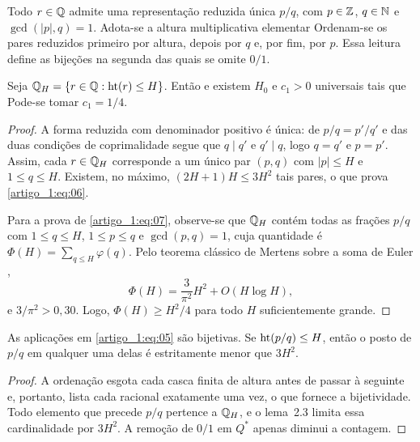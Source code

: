 Todo $r\in\mathbb Q$ admite uma representação reduzida única $p/q$, com $p\in\mathbb Z$, $q\in\mathbb N$ e $\gcd(|p|,q)=1$. Adota-se a altura multiplicativa elementar
Ordenam-se os pares reduzidos primeiro por altura, depois por $q$ e, por fim, por $p$. Essa leitura define as bijeções
na segunda das quais se omite $0/1$.

\begin{lema}\label{map:artigo_1:2.3}
Seja $\mathbb Q_H=\{r\in\mathbb Q:\operatorname{ht}(r)\le H\}$. Então
e existem $H_0$ e $c_1>0$ universais tais que
Pode-se tomar $c_1=1/4$.
\end{lema}
\begin{proof}
A forma reduzida com denominador positivo é única: de $p/q=p'/q'$ e das duas condições de coprimalidade segue que $q\mid q'$ e $q'\mid q$, logo $q=q'$ e $p=p'$. Assim, cada $r\in\mathbb Q_H$ corresponde a um único par $(p,q)$ com $|p|\le H$ e $1\le q\le H$. Existem, no máximo, $(2H+1)H\le3H^2$ tais pares, o que prova \eqref{artigo_1:eq:06}.

Para a prova de \eqref{artigo_1:eq:07}, observe-se que $\mathbb Q_H$ contém todas as frações $p/q$ com $1\le q\le H$, $1\le p\le q$ e $\gcd(p,q)=1$, cuja quantidade é $\Phi(H)=\sum_{q\le H}\varphi(q)$. Pelo teorema clássico de Mertens sobre a soma de Euler \citep[Teorema 330]{artigo_1-hardy2008},
\[
\Phi(H)=\frac3{\pi^2}H^2+O(H\log H),
\]
e $3/\pi^2>0{,}30$. Logo, $\Phi(H)\ge H^2/4$ para todo $H$ suficientemente grande.
\end{proof}

\begin{lema}\label{map:artigo_1:2.4}
As aplicações em \eqref{artigo_1:eq:05} são bijetivas. Se $\operatorname{ht}(p/q)\le H$, então o posto de $p/q$ em qualquer uma delas é estritamente menor que $3H^2$.
\end{lema}
\begin{proof}
A ordenação esgota cada casca finita de altura antes de passar à seguinte e, portanto, lista cada racional exatamente uma vez, o que fornece a bijetividade. Todo elemento que precede $p/q$ pertence a $\mathbb Q_H$, e o lema~2.3 limita essa cardinalidade por $3H^2$. A remoção de $0/1$ em $Q^*$ apenas diminui a contagem.
\end{proof}

